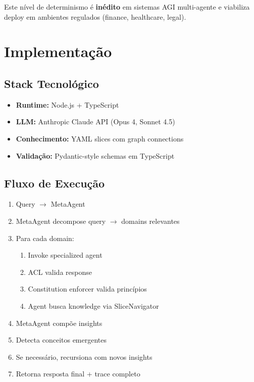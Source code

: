 \documentclass[11pt]{article}
\begin{document}
Este nível de determinismo é \textbf{inédito} em sistemas AGI multi-agente e viabiliza deploy em ambientes regulados (finance, healthcare, legal).

\section{Implementação}

\subsection{Stack Tecnológico}

\begin{itemize}
    \item \textbf{Runtime:} Node.js + TypeScript
    \item \textbf{LLM:} Anthropic Claude API (Opus 4, Sonnet 4.5)
    \item \textbf{Conhecimento:} YAML slices com graph connections
    \item \textbf{Validação:} Pydantic-style schemas em TypeScript
\end{itemize}

\subsection{Fluxo de Execução}

\begin{enumerate}
    \item Query $\rightarrow$ MetaAgent
    \item MetaAgent decompose query $\rightarrow$ domains relevantes
    \item Para cada domain:
    \begin{enumerate}
        \item Invoke specialized agent
        \item ACL valida response
        \item Constitution enforcer valida princípios
        \item Agent busca knowledge via SliceNavigator
    \end{enumerate}
    \item MetaAgent compõe insights
    \item Detecta conceitos emergentes
    \item Se necessário, recursiona com novos insights
    \item Retorna resposta final + trace completo
\end{enumerate}
\end{document}

